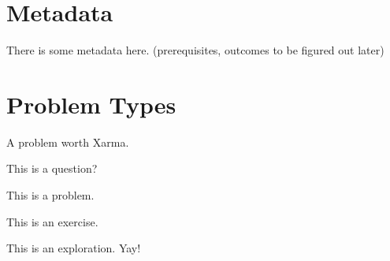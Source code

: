 \documentclass{ximera}
\begin{document}
\section{Metadata}

There is some metadata here. (prerequisites, outcomes to be figured out later)





\section{Problem Types}

\begin{xarmaBoost}
A problem worth Xarma.
\end{xarmaBoost}

\begin{question}
This is a question?
\end{question}

\begin{problem}
This is a problem.
\end{problem}

\begin{exercise}
This is an exercise.
\end{exercise}

\begin{exploration}
This is an exploration. Yay!
\end{exploration}
\end{document}
